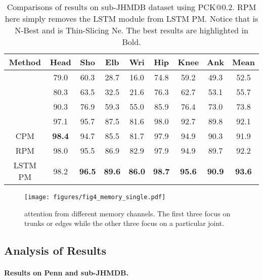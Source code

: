 \documentclass[10pt,twocolumn,letterpaper]{article}
\begin{document}
\renewcommand{\tabcolsep}{2pt}
\begin{table}[!hbp]
  \centering
  \vspace{-10pt}
  \begin{tabular}{c | c c c c c c c | c}
  \toprule
   Method & Head & Sho & Elb & Wri & Hip & Knee & Ank & Mean \\\hline
   \cite{park11videoNB} & 79.0 & 60.3 & 28.7 & 16.0 & 74.8 & 59.2 & 49.3 & 52.5 \\
   \cite{bruce15STjoint} & 80.3 & 63.5 & 32.5 & 21.6 & 76.3 & 62.7 & 53.1 & 55.7 \\
   \cite{iqbal14actpose} & 90.3 & 76.9 & 59.3 & 55.0 & 85.9 & 76.4 & 73.0 & 73.8 \\
   \cite{song17flowAdjST} & 97.1 & 95.7 & 87.5 & 81.6 & 98.0 & 92.7 & 89.8 & 92.1 \\
   CPM \cite{wei16refineCPM} & \textbf{98.4} & 94.7 & 85.5 & 81.7 & 97.9 & 94.9 & 90.3 & 91.9\\\hline
   RPM & 98.0 & 95.5 & 86.9 & 82.9 & 97.9 & 94.9 & 89.7 & 92.2 \\
   LSTM PM & 98.2	& \textbf{96.5} & \textbf{89.6} & \textbf{86.0} & \textbf{98.7}  & \textbf{95.6} & \textbf{90.9} & \textbf{93.6}\\
   \bottomrule
  \end{tabular}
  \vspace{2pt}
  \caption{Comparisons of results on sub-JHMDB dataset using PCK@0.2. RPM here simply removes the LSTM module from LSTM PM. Notice that \cite{park11videoNB} is N-Best and \cite{song17flowAdjST} is Thin-Slicing Ne. The best results are highlighted in Bold.}
  \label{sub-JHMDB}
\end{table}

\begin{figure*}[htbp]
  \center
  \texttt{[image: figures/fig4\_memory\_single.pdf]}
  \vspace{-5pt}
  \caption{attention from different memory channels. The first three focus on trunks or edges while the other three focus on a particular joint.}
  \label{memory}
  \vspace{-10pt}
\end{figure*}

\vspace{-4.5mm}
\subsection{Analysis of Results}
\paragraph{Results on Penn and sub-JHMDB.} 
\end{document}
